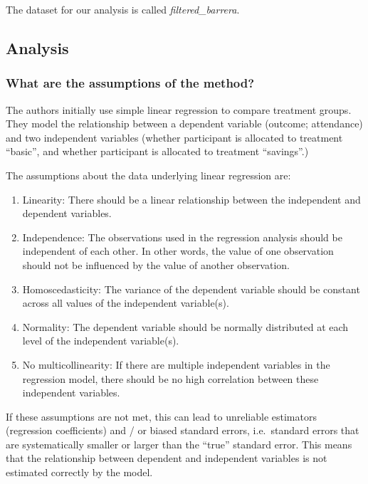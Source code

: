 \documentclass[
]{article}
\begin{document}
The dataset for our analysis is called \emph{filtered\_barrera}.

\hypertarget{analysis}{%
\subsection{Analysis}\label{analysis}}

\hypertarget{what-are-the-assumptions-of-the-method}{%
\subsubsection{What are the assumptions of the
method?}\label{what-are-the-assumptions-of-the-method}}

The authors initially use simple linear regression to compare treatment
groups. They model the relationship between a dependent variable
(outcome; attendance) and two independent variables (whether participant
is allocated to treatment ``basic'', and whether participant is
allocated to treatment ``savings''.)

The assumptions about the data underlying linear regression are:

\begin{enumerate}
\def\labelenumi{\arabic{enumi}.}
\item
  Linearity: There should be a linear relationship between the
  independent and dependent variables.
\item
  Independence: The observations used in the regression analysis should
  be independent of each other. In other words, the value of one
  observation should not be influenced by the value of another
  observation.
\item
  Homoscedasticity: The variance of the dependent variable should be
  constant across all values of the independent variable(s).
\item
  Normality: The dependent variable should be normally distributed at
  each level of the independent variable(s).
\item
  No multicollinearity: If there are multiple independent variables in
  the regression model, there should be no high correlation between
  these independent variables.
\end{enumerate}

If these assumptions are not met, this can lead to unreliable estimators
(regression coefficients) and / or biased standard errors, i.e.~standard
errors that are systematically smaller or larger than the ``true''
standard error. This means that the relationship between dependent and
independent variables is not estimated correctly by the model.
\end{document}

